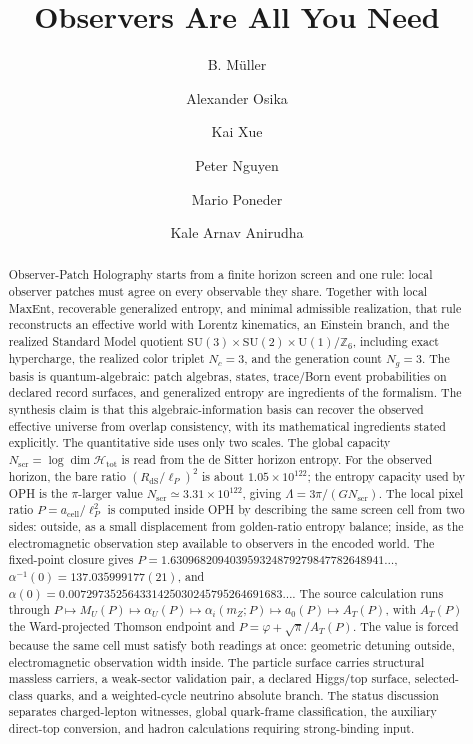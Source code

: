 \documentclass[11pt]{article}
\title{Observers Are All You Need}
\author{B. M\"uller \and Alexander Osika \and Kai Xue \and Peter Nguyen \and Mario Poneder \and Kale Arnav Anirudha}
\date{\OPHPaperReleaseDate}
\newcommand{\SU}{\mathrm{SU}}
\newcommand{\U}{\mathrm{U}}
\begin{document}
\maketitle
\OPHPaperReleaseBanner

\begin{abstract}
Observer-Patch Holography starts from a finite horizon screen and one rule: local observer
patches must agree on every observable they share. Together with local MaxEnt, recoverable
generalized entropy, and minimal admissible realization, that rule reconstructs an effective
world with Lorentz kinematics, an Einstein branch, and the realized Standard Model quotient
\(\SU(3)\times\SU(2)\times\U(1)/\mathbb Z_6\), including exact hypercharge, the realized color
triplet \(N_c=3\), and the generation count \(N_g=3\). The basis is quantum-algebraic:
patch algebras, states, trace/Born event probabilities on declared record surfaces, and
generalized entropy are ingredients of the formalism. The synthesis claim is that this
algebraic-information basis can recover the observed effective universe from overlap
consistency, with its mathematical ingredients stated explicitly. The quantitative side uses only two scales. The global capacity
\(N_{\mathrm{scr}}=\log\dim\mathcal H_{\mathrm{tot}}\) is read from the de Sitter horizon entropy. For the observed
horizon, the bare ratio \((R_{\mathrm{dS}}/\ell_P)^2\) is about \(1.05\times10^{122}\);
the entropy capacity used by OPH is the \(\pi\)-larger value \(N_{\mathrm{scr}}\simeq
3.31\times10^{122}\), giving \(\Lambda=3\pi/(G N_{\mathrm{scr}})\). The local pixel ratio
\(P=a_{\mathrm{cell}}/\ell_P^2\) is computed inside OPH by describing the same screen cell from two
sides: outside, as a small displacement from golden-ratio entropy balance; inside, as the
electromagnetic observation step available to observers in the encoded world. The fixed-point
closure gives \(P=1.630968209403959324879279847782648941\ldots\),
\(\alpha^{-1}(0)=137.035999177(21)\), and
\(\alpha(0)=0.007297352564331425030245795264691683\ldots\). The source
calculation runs through \(P\mapsto M_U(P)\mapsto\alpha_U(P)\mapsto
\alpha_i(m_Z;P)\mapsto a_0(P)\mapsto A_T(P)\), with \(A_T(P)\) the
Ward-projected Thomson endpoint and \(P=\varphi+\sqrt{\pi}/A_T(P)\). The value
is forced because the same cell must satisfy both readings at once: geometric
detuning outside, electromagnetic observation width inside. The particle
surface carries structural massless carriers, a weak-sector validation pair, a declared
Higgs/top surface, selected-class quarks, and a weighted-cycle neutrino absolute branch. The
status discussion separates charged-lepton witnesses, global quark-frame classification, the
auxiliary direct-top conversion, and hadron calculations requiring strong-binding input.
\end{abstract}
\end{document}
